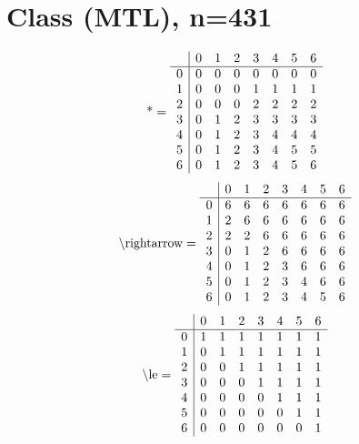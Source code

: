 \documentclass[11pt]{article}
\begin{document}
\section{Class (MTL), n=431}
\[\text{*} = 
\begin{array}{r | r r r r r r r}
 & 0 & 1 & 2 & 3 & 4 & 5 & 6 \\ \hline
0 & 0 & 0 & 0 & 0 & 0 & 0 & 0 \\
1 & 0 & 0 & 0 & 1 & 1 & 1 & 1 \\
2 & 0 & 0 & 0 & 2 & 2 & 2 & 2 \\
3 & 0 & 1 & 2 & 3 & 3 & 3 & 3 \\
4 & 0 & 1 & 2 & 3 & 4 & 4 & 4 \\
5 & 0 & 1 & 2 & 3 & 4 & 5 & 5 \\
6 & 0 & 1 & 2 & 3 & 4 & 5 & 6 \\
\end{array}
\]
\[\text{\textbackslash rightarrow} = 
\begin{array}{r | r r r r r r r}
 & 0 & 1 & 2 & 3 & 4 & 5 & 6 \\ \hline
0 & 6 & 6 & 6 & 6 & 6 & 6 & 6 \\
1 & 2 & 6 & 6 & 6 & 6 & 6 & 6 \\
2 & 2 & 2 & 6 & 6 & 6 & 6 & 6 \\
3 & 0 & 1 & 2 & 6 & 6 & 6 & 6 \\
4 & 0 & 1 & 2 & 3 & 6 & 6 & 6 \\
5 & 0 & 1 & 2 & 3 & 4 & 6 & 6 \\
6 & 0 & 1 & 2 & 3 & 4 & 5 & 6 \\
\end{array}
\]
\[\text{\textbackslash le} = 
\begin{array}{r | r r r r r r r}
 & 0 & 1 & 2 & 3 & 4 & 5 & 6 \\ \hline
0 & 1 & 1 & 1 & 1 & 1 & 1 & 1 \\
1 & 0 & 1 & 1 & 1 & 1 & 1 & 1 \\
2 & 0 & 0 & 1 & 1 & 1 & 1 & 1 \\
3 & 0 & 0 & 0 & 1 & 1 & 1 & 1 \\
4 & 0 & 0 & 0 & 0 & 1 & 1 & 1 \\
5 & 0 & 0 & 0 & 0 & 0 & 1 & 1 \\
6 & 0 & 0 & 0 & 0 & 0 & 0 & 1 \\
\end{array}
\]
\end{document}
